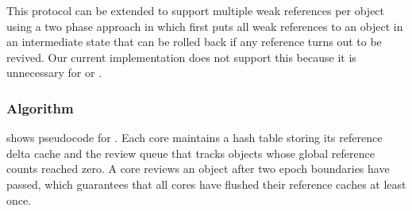 This protocol can be extended to support multiple weak references per
object using a two phase approach in which  first puts
all weak references to an object in an intermediate state that can be
rolled back if any
reference turns out to be revived.  Our current implementation does
not support this because it is unnecessary for \vm or \fs.

\subsubsection{Algorithm}
 shows pseudocode for .  Each core
maintains a hash table
storing its reference delta cache and the review queue that tracks
objects whose global reference counts reached zero.  A core reviews an
object after two epoch boundaries have passed, which guarantees
that all cores have flushed their
reference caches at least once.

